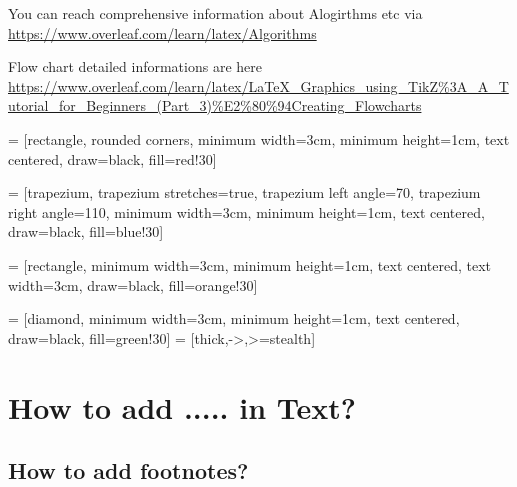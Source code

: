 You can reach comprehensive information about Alogirthms etc via \url{https://www.overleaf.com/learn/latex/Algorithms}

Flow chart detailed informations are here \url{https://www.overleaf.com/learn/latex/LaTeX_Graphics_using_TikZ%3A_A_Tutorial_for_Beginners_(Part_3)%E2%80%94Creating_Flowcharts}



 = [rectangle, rounded corners, 
minimum width=3cm, 
minimum height=1cm,
text centered, 
draw=black, 
fill=red!30]

 = [trapezium, 
trapezium stretches=true, %
trapezium left angle=70, 
trapezium right angle=110, 
minimum width=3cm, 
minimum height=1cm, text centered, 
draw=black, fill=blue!30]

 = [rectangle, 
minimum width=3cm, 
minimum height=1cm, 
text centered, 
text width=3cm, 
draw=black, 
fill=orange!30]

 = [diamond, 
minimum width=3cm, 
minimum height=1cm, 
text centered, 
draw=black, 
fill=green!30]
 = [thick,->,>=stealth]


    
\section{How to add ..... in Text?}
\subsection{How to add footnotes?}

